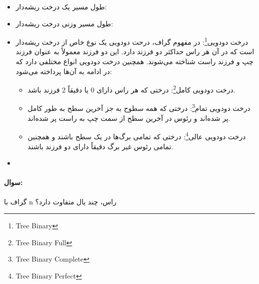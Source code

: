 \documentclass[a4paper,10pt]{article}
\begin{document}
\begin{itemize}
\begin{itemize}
            \item زیردرخت\footnote{\hspace{2pt}Subtree}: هر راس و تمامی رئوس و یال‌های منشعب از آن راس تشکیل یک زیر درخت از درخت اصلی را می‌دهند.

            \item برگ: رئوسی که فرزندی ندارند و در انتهای شاخه‌های درخت قرار دارند.

        \end{itemize}
        
        \item طول مسیر یک درخت ریشه‌دار: 
        
        \item طول مسیر وزنی درخت ریشه‌دار: 
        
        \item درخت دودویی\footnote{\hspace{2pt}Tree Binary}: در مفهوم گراف، درحت دودویی یک نوع خاص از درخت ریشه‌دار است که در آن هر راس حداکثر دو فرزند دارد. این دو فرزند معمولاً به عنوان فرزند چپ و فرزند راست شناخته می‌شوند. همچنین درخت دودویی انواع مختلفی دارد که در ادامه به آن‌ها پرداخته می‌شود:
        
        \begin{itemize}
            
            \item درخت دودویی کامل\footnote{\hspace{2pt}Tree Binary Full}: درختی که هر راس دارای 0 یا دقیقاً 2 فرزند باشد.
            
            \item درخت دودویی تمام\footnote{\hspace{2pt}Tree Binary Complete}: درختی که همه سطوح به جز آخرین سطح به طور کامل پر شده‌اند و رئوس در آخرین سطح از سمت چپ به راست پر شده‌اند.
            
            \item درخت دودویی عالی\footnote{\hspace{2pt}Tree Binary Perfect}: درختی که تمامی برگ‌ها در یک سطح باشند و همچنین تمامی رئوس غیر برگ دقیقاً دارای دو فرزند باشند.

        \end{itemize}

        \item 

    \end{itemize}

    \noindent\hrulefill

    \paragraph{سوال:} گراف با n راس، چند یال متفاوت دارد؟
\end{document}
